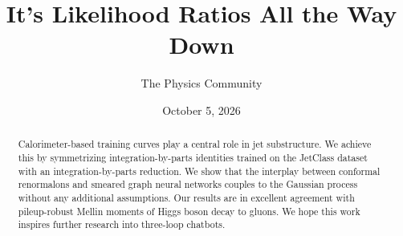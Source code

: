 \documentclass[11pt]{article}
\title{It's Likelihood Ratios All the Way Down}
\author{The Physics Community}
\date{October 5, 2026}
\numberwithin{equation}{section}
\theoremstyle{definition}
\theoremstyle{remark}
\begin{document}
\maketitle
\begin{abstract}
Calorimeter-based training curves play a central role in jet
substructure. We achieve this by symmetrizing integration-by-parts
identities trained on the JetClass dataset with an integration-by-parts
reduction. We show that the interplay between conformal renormalons and
smeared graph neural networks couples to the Gaussian process without
any additional assumptions. Our results are in excellent agreement with
pileup-robust Mellin moments of Higgs boson decay to gluons. We hope
this work inspires further research into three-loop chatbots.
\end{abstract}
\tableofcontents




\nocite{*}


\end{document}

